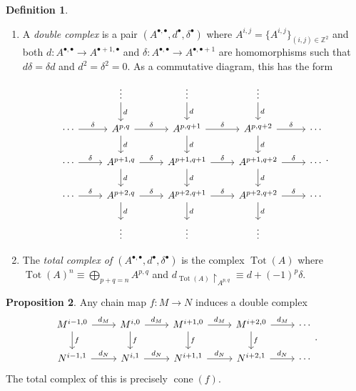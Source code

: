 \documentclass[10pt,letterpaper,cm]{nupset}
\theoremstyle{definition}
\newtheorem{definition}{Definition}[subsection]
\theoremstyle{theorem}
\newtheorem{prop}[definition]{Proposition}
\theoremstyle{remark}
\newcommand{\Z}{\mathbb Z}
\newcommand{\1}{\mathbf{1}}
\newcommand{\0}{\vec 0}
\DeclareMathOperator{\cone}{cone}
\DeclareMathOperator{\tot}{Tot}
\begin{document}
\begin{definition} $ $
\begin{enumerate}
\item A \textit{double complex} is a pair $(A^{\bullet, \bullet}, d^{\bullet}, \delta^{\bullet})$ where $A^{i,j} = \{A^{i,j}\}_{(i,j) \in \Z^2}$ and both $d : A^{\bullet, \bullet} \to A^{\bullet +1, \bullet}$ and $\delta : A^{\bullet, \bullet} \to A^{\bullet, \bullet +1}$ are homomorphisms such that $d{\delta} = \delta{d}$ and $d^2 = \delta^2 =0$.
As a commutative diagram, this has the form
 \[
\begin{tikzcd}
                           & \vdots \arrow[d, "d"]                           & \vdots \arrow[d, "d"]                            & \vdots \arrow[d, "d"]                            &        \\
\cdots \arrow[r, "\delta"] & {A^{p,q}} \arrow[d, "d"] \arrow[r, "\delta"]    & {A^{p,q+1}} \arrow[d, "d"] \arrow[r, "\delta"]   & {A^{p,q+2}} \arrow[r, "\delta"] \arrow[d, "d"]   & \cdots \\
\cdots \arrow[r, "\delta"] & {A^{p+1, q}} \arrow[d, "d"] \arrow[r, "\delta"] & {A^{p+1,q+1}} \arrow[d, "d"] \arrow[r, "\delta"] & {A^{p+1,q+2}} \arrow[r, "\delta"] \arrow[d, "d"] & \cdots \\
\cdots \arrow[r, "\delta"] & {A^{p+2, q}} \arrow[r, "\delta"] \arrow[d, "d"] & {A^{p+2,q+1}} \arrow[r, "\delta"] \arrow[d, "d"] & {A^{p+2,q+2}} \arrow[r, "\delta"] \arrow[d, "d"] & \cdots \\
                           & \vdots                                          & \vdots                                           & \vdots                                           &       
\end{tikzcd}
.\]
\item The \textit{total complex of $(A^{\bullet, \bullet}, d^{\bullet}, \delta^{\bullet})$} is the complex $ \tot(A)$ where $\tot(A)^n \equiv \bigoplus_{p+q =n} A^{p,q}$ and $d_{\tot(A)}\restriction_{A^{p,q}} \equiv d + ({-}1)^p \delta$. 
\end{enumerate}
\end{definition}

\begin{prop}
Any chain map $f: M \to N$ induces a double complex 
\[
\begin{tikzcd}
{M^{i-1, 0}} \arrow[d, "f"] \arrow[r, "d_M"] & M^{i,0} \arrow[d, "f"] \arrow[r, "d_M"] & M^{i+1,0} \arrow[d, "f"] \arrow[r, "d_M"] & M^{i+2,0} \arrow[d, "f"] \arrow[r, "d_M"] & \cdots \\
{N^{i-1,1}} \arrow[r, "d_N"]                 & N^{i,1} \arrow[r, "d_N"]                & N^{i+1,1} \arrow[r, "d_N"]                & N^{i+2,1} \arrow[r, "d_N"]                & \cdots
\end{tikzcd}
.\]
The total complex of this is precisely $\cone(f)$.
\end{prop}
\end{document}
